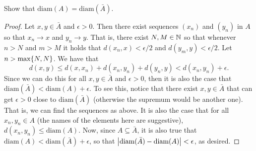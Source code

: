 \begin{exercise}{19}
Show that $\text{diam}(A)=\text{diam}(\bar{A})$.
\end{exercise}
\begin{proof}
Let $x,y\in\bar{A}$ and $\epsilon>0$.
Then there exist sequences $(x_n)$ and $(y_n)$ in $A$ so that $x_n\to x$ and $y_n\to y$.
That is, there exist $N,M\in\mathbb{N}$ so that whenever $n>N$ and $m>M$ it holds that $d(x_n,x)<\epsilon/2$ and $d(y_m,y)<\epsilon/2$. 
Let $n>\max\{N,N\}$.
We have that 
\[
d(x,y) 
\leq d(x,x_n)+d(x_n,y_n)+d(y_n,y) 
< d(x_n,y_n)+\epsilon.
\]
Since we can do this for all $x,y\in\bar{A}$ and $\epsilon>0$, then it is also the case that $\text{diam}(\bar{A})<\text{diam}(A)+\epsilon$.
To see this, notice that there exist $x,y\in\bar{A}$ that can get $\epsilon>0$ close to $\text{diam}(\bar{A})$ 
(otherwise the supremum would be another one).
That is, we can find the sequences as above.
It is also the case that for all $x_n,y_n\in A$ (the names of the elements here are suggestive), $d(x_n,y_n)\leq\text{diam}(A)$.
Now, since $A\subseteq\bar{A}$, it is also true that $\text{diam}(A)<\text{diam}(\bar{A})+\epsilon$, so that $\left\lvert \text{diam}(\bar{A})-\text{diam}(A)\right\rvert<\epsilon$, as desired.
\end{proof} 

